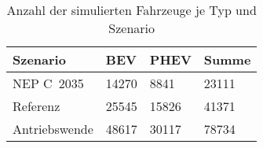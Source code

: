 {
\renewcommand{\arraystretch}{1.2}%
\begin{table}[H]
	\begin{center}
		\caption{Anzahl der simulierten Fahrzeuge je Typ und Szenario}
		\begin{tabu} to 0.6\textwidth {X[1.2] X[1, r] X[1, r] X[1, r]}
			\toprule
			Szenario         & BEV         & PHEV        & Summe       \\ \midrule
			NEP C~\num{2035} & \num{14270} & \num{8841}  & \num{23111} \\
			Referenz         & \num{25545} & \num{15826} & \num{41371} \\
			Antriebswende    & \num{48617} & \num{30117} & \num{78734} \\ \bottomrule
		\end{tabu}
		\label{tab:car_count}
	\end{center}
	\vspace{-3mm}%
\end{table}
}